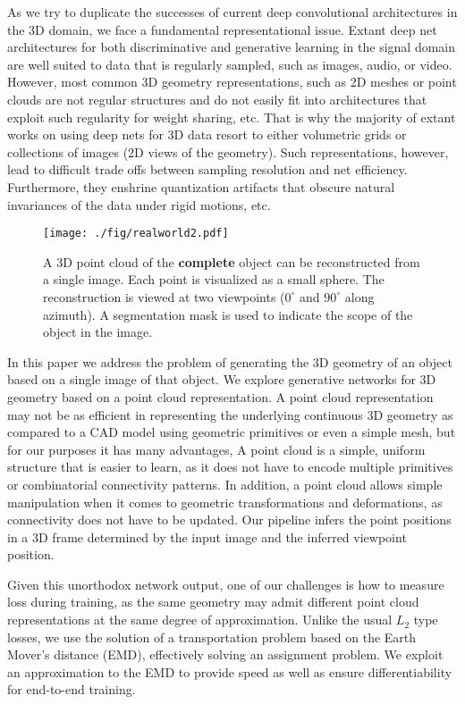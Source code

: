 \documentclass[10pt,twocolumn,letterpaper]{article}
\begin{document}
As we try to duplicate the successes of current deep convolutional architectures in the 3D domain, we face a fundamental representational issue. Extant deep net architectures for both discriminative and generative learning in the signal domain are well suited to data that is regularly sampled, such as images, audio, or video. However, most common 3D geometry representations, such as 2D meshes or point clouds are not regular structures and do not easily fit into architectures that exploit such regularity for weight sharing, etc.  That is why the majority of extant works on using deep nets for 3D data resort to either volumetric grids or collections of images (2D views of the geometry). Such representations, however, lead to difficult trade offs between sampling resolution and net efficiency. Furthermore, they enshrine quantization artifacts that obscure natural invariances of the data under rigid motions, etc.
\begin{figure}[t!]
	\centering
	\texttt{[image: ./fig/realworld2.pdf]}
	\caption{A 3D point cloud of the {\bf complete} object can be reconstructed from a single image. Each point is visualized as a small sphere. The reconstruction is viewed at two viewpoints ($0^{\circ}$ and $90^{\circ}$ along azimuth). A segmentation mask is used to indicate the scope of the object in the image.}
	\label{fig:teaser}
	\vspace{-1em}
\end{figure}

In this paper we address the problem of generating the 3D geometry of an object based on a single image of that object. We explore generative networks for 3D geometry based on a point cloud representation. A point cloud representation may not be as efficient in representing the underlying continuous 3D geometry as compared to a CAD model using geometric primitives or even a simple mesh, but for our purposes it has many advantages, A point cloud is a simple, uniform structure that is easier to learn, as it does not have to encode multiple primitives or combinatorial connectivity patterns. In addition, a point cloud allows simple manipulation when it comes to geometric transformations and deformations, as connectivity does not have to be updated. Our pipeline infers the point positions in a 3D frame determined by the input image and the inferred viewpoint position.



Given this unorthodox network output, one of our challenges is how to measure loss during training, as the same geometry may admit different point cloud representations at the same degree of approximation. Unlike the usual $L_2$ type losses, we use the solution of a transportation problem based on the Earth Mover's distance (EMD), effectively solving an assignment problem. We exploit an approximation to the EMD to provide speed as well as ensure differentiability for end-to-end training.
\end{document}
